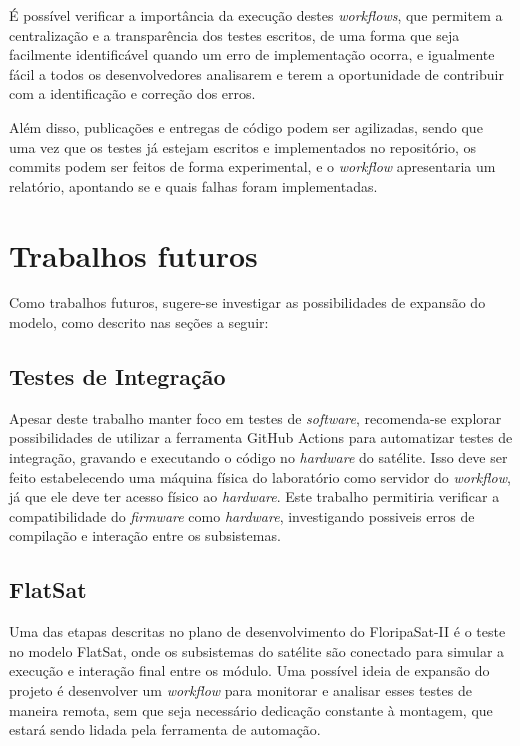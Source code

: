     É possível verificar a importância da execução destes \textit{workflows}, que permitem a centralização e a transparência dos testes escritos, de uma forma que seja facilmente identificável quando um erro de implementação ocorra, e igualmente fácil a todos os desenvolvedores analisarem e terem a oportunidade de contribuir com a identificação e correção dos erros.
    
    Além disso, publicações e entregas de código podem ser agilizadas, sendo que uma vez que os testes já estejam escritos e implementados no repositório, os commits podem ser feitos de forma experimental, e o \textit{workflow} apresentaria um relatório, apontando se e quais falhas foram implementadas.
    
    \section{Trabalhos futuros}
        Como trabalhos futuros, sugere-se investigar as possibilidades de expansão do modelo, como descrito nas seções a seguir:
    \label{conclusao:futuros}
        \subsection{Testes de Integração}
        \label{futuros:hardware}
            Apesar deste trabalho manter foco em testes de \textit{software}, recomenda-se explorar possibilidades de utilizar a ferramenta GitHub Actions para automatizar testes de integração, gravando e executando o código no \textit{hardware} do satélite. Isso deve ser feito estabelecendo uma máquina física do laboratório como servidor do \textit{workflow}, já que ele deve ter acesso físico ao \textit{hardware}. Este trabalho permitiria verificar a compatibilidade do \textit{firmware} como \textit{hardware}, investigando possiveis erros de compilação e interação entre os subsistemas.
        \subsection{FlatSat}
        \label{futuros:flatsat}
            Uma das etapas descritas no plano de desenvolvimento do FloripaSat-II é o teste no modelo FlatSat, onde os subsistemas do satélite são conectado para simular a execução e interação final entre os módulo. Uma possível ideia de expansão do projeto é desenvolver um \textit{workflow} para monitorar e analisar esses testes de maneira remota, sem que seja necessário dedicação constante à montagem, que estará sendo lidada pela ferramenta de automação.
